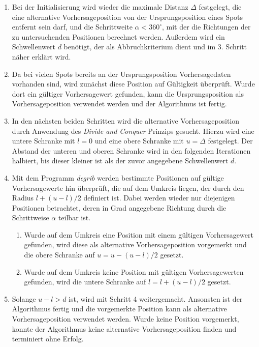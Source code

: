 \begin{enumerate}

\item Bei der Initialisierung wird wieder die maximale Distanz
  $\Delta$ festgelegt, die eine alternative Vorhersageposition von der
  Ursprungsposition eines Spots entfernt sein darf, und die
  Schrittweite $\alpha < 360^{\circ}$, mit der die Richtungen der zu
  untersuchenden Positionen berechnet werden. Außerdem wird ein
  Schwellenwert $d$ benötigt, der als Abbruchkriterium dient und im
  3. Schritt näher erklärt wird.

\item Da bei vielen Spots bereits an der Ursprungsposition
  Vorhersagedaten vorhanden sind, wird zunächst diese Position auf
  Gültigkeit überprüft. Wurde dort ein gültiger Vorhersagewert
  gefunden, kann die Ursprungsposition als Vorhersageposition
  verwendet werden und der Algorithmus ist fertig.

\item In den nächsten beiden Schritten wird die alternative
  Vorhersageposition durch Anwendung des \textit{Divide and Conquer}
  Prinzips gesucht. Hierzu wird eine untere Schranke mit $l = 0$ und
  eine obere Schranke mit $u = \Delta$ festgelegt. Der Abstand der
  unteren und oberen Schranke wird in den folgenden Iterationen
  halbiert, bis dieser kleiner ist als der zuvor angegebene
  Schwellenwert $d$. 

\item Mit dem Programm \textit{degrib} werden bestimmte Positionen auf
  gültige Vorhersagewerte hin überprüft, die auf dem Umkreis liegen,
  der durch den Radius $l + (u - l)/2$ definiert ist. Dabei werden
  wieder nur diejenigen Positionen betrachtet, deren in Grad
  angegebene Richtung durch die Schrittweise $\alpha$ teilbar ist.

  \begin{enumerate}

  \item Wurde auf dem Umkreis eine Position mit einem gültigen
    Vorhersagewert gefunden, wird diese als alternative
    Vorhersageposition vorgemerkt und die obere Schranke auf $u = u -
    (u - l)/2$ gesetzt.

  \item Wurde auf dem Umkreis keine Position mit gültigen
    Vorhersagewerten gefunden, wird die untere Schranke auf $l = l + (u -
    l)/2$ gesetzt.

  \end{enumerate}

\item Solange $u - l > d$ ist, wird mit Schritt 4
  weitergemacht. Ansonsten ist der Algorithmus fertig und die
  vorgemerkte Position kann als alternative Vorhersageposition
  verwendet werden. Wurde keine Position vorgemerkt, konnte der
  Algorithmus keine alternative Vorhersageposition finden und
  terminiert ohne Erfolg.

\end{enumerate}

